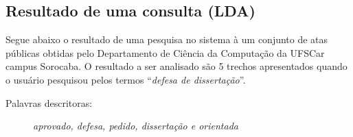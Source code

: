 \newpage

\subsection*{Resultado de uma consulta (LDA)}

Segue abaixo o resultado de uma pesquisa no sistema à um conjunto de atas públicas obtidas pelo Departamento de Ciência da Computação da UFSCar campus Sorocaba. O resultado a ser analisado são 5 trechos apresentados quando o usuário pesquisou pelos termos ``\textit{defesa de dissertação}''.

\vspace{0.5 cm}

\begin{description}
	\item[Palavras descritoras: ] \textit{aprovado, defesa, pedido, dissertação e orientada}
\end{description}


